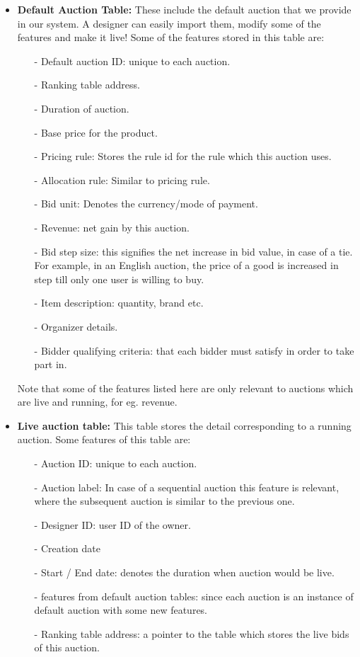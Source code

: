 \documentclass[a4paper]{article}
\begin{document}
\begin{itemize}
    \item \textbf{Default Auction Table:} These include the default auction that we provide in our system. A designer can easily import them, modify some of the features and make it live! Some of the features stored in this table are:
    \begin{itemize}
        \item[-] Default auction ID: unique to each auction.
        \item[-] Ranking table address. 
        \item[-] Duration of auction.
        \item[-] Base price for the product.
        \item[-] Pricing rule: Stores the rule id for the rule which this auction uses.
        \item[-] Allocation rule: Similar to pricing rule.
        \item[-] Bid unit: Denotes the currency/mode of payment.
        \item[-] Revenue: net gain by this auction.
        \item[-] Bid step size: this signifies the net increase in bid value, in case of a tie. For example, in an English auction, the price of a good is increased in step till only one user is willing to buy.
        \item[-] Item description: quantity, brand etc.
        \item[-] Organizer details.
        \item[-] Bidder qualifying criteria: that each bidder must satisfy in order to take part in.
    \end{itemize}
    Note that some of the features listed here are only relevant to auctions which are live and running, for eg. revenue.
    \item \textbf{Live auction table:} This table stores the detail corresponding to a running auction. Some features of this table are:
    \begin{itemize}
        \item[-] Auction ID: unique to each auction.
        \item[-] Auction label: In case of a sequential auction this feature is relevant, where the subsequent auction is similar to the previous one.\cite{treasury}
        \item[-] Designer ID: user ID of the owner.
        \item[-] Creation date
        \item[-] Start / End date: denotes the duration when auction would be live.
        \item[-] features from default auction tables: since each auction is an instance of default auction with some new features.
        \item[-] Ranking table address: a pointer to the table which stores the live bids of this auction.
    \end{itemize}


\end{itemize}
\end{document}
